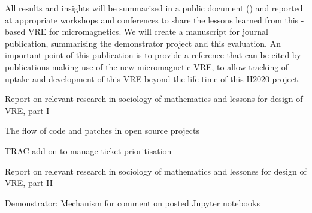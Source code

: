 \begin{workpackage}[id=social-aspects,wphases=0-48,
  title=Social Aspects,
  lead=UO,
  UORM=23,USHRM=18,USORM=6]
\begin{tasklist}
\begin{task}[title=Evaluation of Micromagnetic VRE,lead=USO,PM=6,
id=oommf-nb-evaluation,partners={UO,PS}]
  All results and insights will be summarised in a public document
  () and reported at appropriate
  workshops and conferences to share the lessons learned from this
  \Jupyter-based VRE for micromagnetics. We will create a manuscript
  for journal publication, summarising the demonstrator project and
  this evaluation. An important point of this publication is to
  provide a reference that can be cited by publications making use of
  the new micromagnetic VRE, to allow tracking of uptake and
  development of this VRE beyond the life time of this H2020 project.
\end{task}



\end{tasklist}


\begin{wpdelivs}
\begin{wpdeliv}[due=3,id=social-report,dissem=PU,nature=R,lead=UO]
 {Report on relevant research in sociology of mathematics and lessons
   for design of \TheProject VRE, part I}
\end{wpdeliv}

\begin{wpdeliv}[due=18,id=social-datareport,dissem=PU,nature=R,lead=UO]
{The flow of code and patches in open source projects}
\end{wpdeliv}

\begin{wpdeliv}[due=24,id=social-tracaddon,dissem=PU,nature=OTHER,lead=UO]
{TRAC add-on to manage ticket prioritisation}
\end{wpdeliv}

\begin{wpdeliv}[due=24,id=social-report-two,dissem=PU,nature=R,lead=UO]
 {Report on relevant research in sociology of mathematics and lessones
   for design of \TheProject VRE, part II}
\end{wpdeliv}
\begin{wpdeliv}[due=24,id=jupyter-comment,dissem=PU,nature=DEM,lead=USH]
   {Demonstrator: Mechanism for comment on posted Jupyter notebooks} 
\end{wpdeliv}


\end{wpdelivs}
\end{workpackage}
